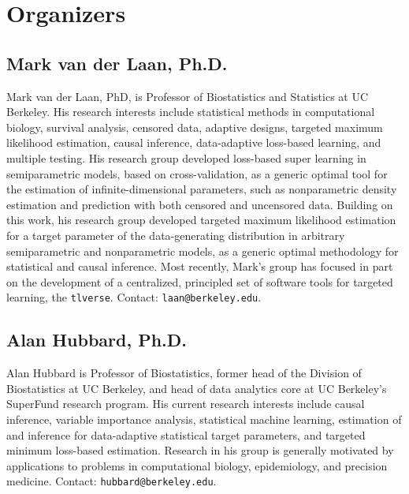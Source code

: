 \documentclass[a4paper,11pt]{texMemo}
\begin{document}
\section{Organizers}

\subsection*{Mark van der Laan, Ph.D.}

\vspace{-.5em}

Mark van der Laan, PhD, is Professor of Biostatistics and Statistics at UC Berkeley. His research interests include statistical methods in computational
biology, survival analysis, censored data, adaptive designs, targeted maximum likelihood estimation, causal inference, data-adaptive loss-based learning, and multiple testing. His research group developed loss-based super learning in semiparametric models, based on cross-validation, as a generic optimal tool for the estimation of infinite-dimensional parameters, such as nonparametric density
estimation and prediction with both censored and uncensored data. Building on this work, his research group developed targeted maximum likelihood estimation for a target parameter of the data-generating distribution in arbitrary
semiparametric and nonparametric models, as a generic optimal methodology for statistical and causal inference. Most recently, Mark's group has focused in
part on the development of a centralized, principled set of software tools for targeted learning, the \texttt{tlverse}. Contact: \texttt{laan@berkeley.edu}.

\vspace{-.5em}

\subsection*{Alan Hubbard, Ph.D.}

\vspace{-.5em}

Alan Hubbard is Professor of Biostatistics, former head of the Division of Biostatistics at UC Berkeley, and head of data analytics core at UC Berkeley's
SuperFund research program. His current research interests include causal inference, variable importance analysis, statistical machine learning,
estimation of and inference for data-adaptive statistical target parameters, and targeted minimum loss-based estimation. Research in his group is generally motivated by applications to problems in computational biology, epidemiology,
and precision medicine. Contact: \texttt{hubbard@berkeley.edu}.
\end{document}
